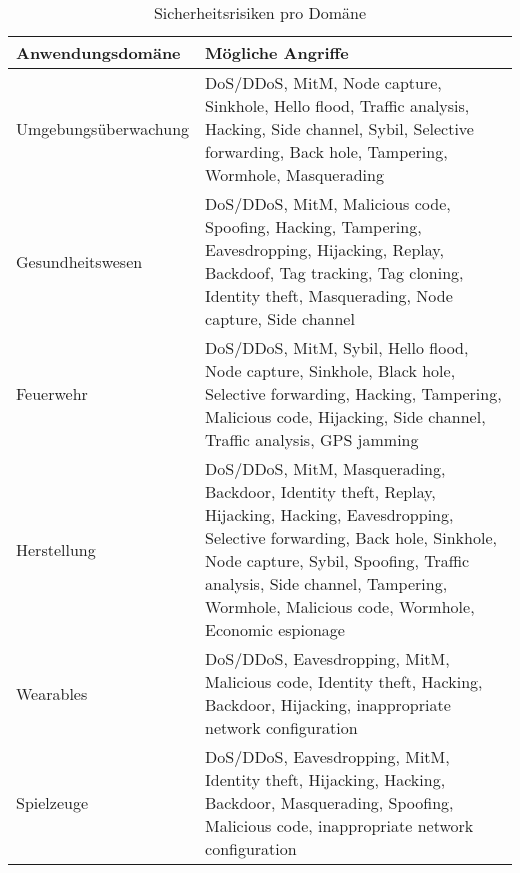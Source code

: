 \begin{table}
  \footnotesize
  \centering
  \label{tab:security-threats}
  \begin{tabular}{p{4cm}p{9cm}}
    \textbf{Anwendungsdomäne} & \textbf{Mögliche Angriffe}\\
    \hline
    Umgebungsüberwachung & DoS/DDoS, MitM, Node capture, Sinkhole, Hello flood,
    Traffic analysis, Hacking, Side channel, Sybil, Selective forwarding, Back
    hole, Tampering, Wormhole, Masquerading \\

    Gesundheitswesen & DoS/DDoS, MitM, Malicious code, Spoofing, Hacking,
    Tampering, Eavesdropping, Hijacking, Replay, Backdoof, Tag tracking, Tag
    cloning, Identity theft, Masquerading, Node capture, Side channel \\

    Feuerwehr & DoS/DDoS, MitM, Sybil, Hello flood, Node capture, Sinkhole,
    Black hole, Selective forwarding, Hacking, Tampering, Malicious code,
    Hijacking, Side channel, Traffic analysis, GPS jamming \\

    Herstellung & DoS/DDoS, MitM, Masquerading, Backdoor, Identity theft,
    Replay, Hijacking, Hacking, Eavesdropping, Selective forwarding, Back hole,
    Sinkhole, Node capture, Sybil, Spoofing, Traffic analysis, Side channel,
    Tampering, Wormhole, Malicious code, Wormhole, Economic espionage \\

    Wearables & DoS/DDoS, Eavesdropping, MitM, Malicious code, Identity theft,
    Hacking, Backdoor, Hijacking, inappropriate network configuration \\

    Spielzeuge & DoS/DDoS, Eavesdropping, MitM, Identity theft, Hijacking,
    Hacking, Backdoor, Masquerading, Spoofing, Malicious code, inappropriate
    network configuration
  \end{tabular}
  \caption{Sicherheitsrisiken pro Domäne \cite{paper}}
\end{table}

